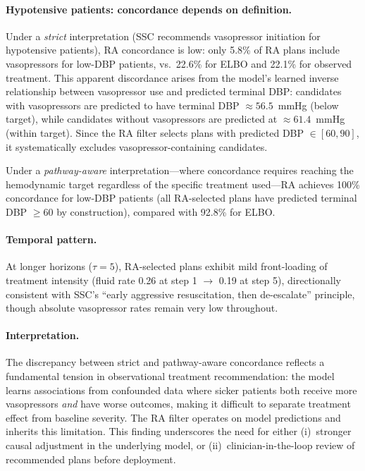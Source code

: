 \documentclass{article}
\begin{document}
\paragraph{Hypotensive patients: concordance depends on definition.} Under a \emph{strict} interpretation (SSC recommends vasopressor initiation for hypotensive patients), RA concordance is low: only 5.8\% of RA plans include vasopressors for low-DBP patients, vs.\ 22.6\% for ELBO and 22.1\% for observed treatment. This apparent discordance arises from the model's learned inverse relationship between vasopressor use and predicted terminal DBP: candidates with vasopressors are predicted to have terminal DBP $\approx 56.5$~mmHg (below target), while candidates without vasopressors are predicted at $\approx 61.4$~mmHg (within target). Since the RA filter selects plans with predicted DBP $\in [60,90]$, it systematically excludes vasopressor-containing candidates.

Under a \emph{pathway-aware} interpretation---where concordance requires reaching the hemodynamic target regardless of the specific treatment used---RA achieves 100\% concordance for low-DBP patients (all RA-selected plans have predicted terminal DBP $\geq 60$ by construction), compared with 92.8\% for ELBO.

\paragraph{Temporal pattern.} At longer horizons ($\tau = 5$), RA-selected plans exhibit mild front-loading of treatment intensity (fluid rate 0.26 at step 1 $\to$ 0.19 at step 5), directionally consistent with SSC's ``early aggressive resuscitation, then de-escalate'' principle, though absolute vasopressor rates remain very low throughout.

\paragraph{Interpretation.} The discrepancy between strict and pathway-aware concordance reflects a fundamental tension in observational treatment recommendation: the model learns associations from confounded data where sicker patients both receive more vasopressors \emph{and} have worse outcomes, making it difficult to separate treatment effect from baseline severity. The RA filter operates on model predictions and inherits this limitation. This finding underscores the need for either (i)~stronger causal adjustment in the underlying model, or (ii)~clinician-in-the-loop review of recommended plans before deployment.
\end{document}
